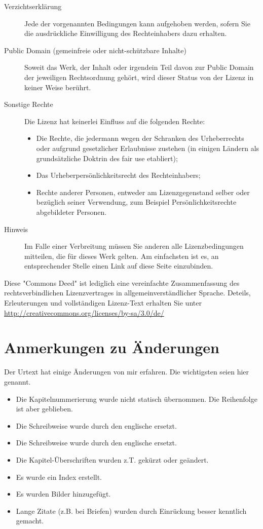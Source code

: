 \begin{description}
    \item[Verzichtserklärung] Jede der vorgenannten Bedingungen kann aufgehoben werden, 
	  sofern Sie die ausdrückliche Einwilligung des Rechteinhabers dazu erhalten.
    \item[Public Domain (gemeinfreie oder nicht-schützbare Inhalte)] Soweit das Werk, 
	  der Inhalt oder irgendein Teil davon zur Public Domain der jeweiligen Rechtsordnung 
	  gehört, wird dieser Status von der Lizenz in keiner Weise berührt.
    \item[Sonstige Rechte] Die Lizenz hat keinerlei Einfluss auf die folgenden Rechte:
      \begin{itemize}
          \item Die Rechte, die jedermann wegen der Schranken des Urheberrechts oder 
		aufgrund gesetzlicher Erlaubnisse zustehen (in einigen Ländern als 
		grundsätzliche Doktrin des fair use etabliert);
          \item Das Urheberpersönlichkeitsrecht des Rechteinhabers;
          \item Rechte anderer Personen, entweder am Lizenzgegenstand selber oder bezüglich 
		seiner Verwendung, zum Beispiel Persönlichkeitsrechte abgebildeter Personen.
      \end{itemize}
    \item[Hinweis] Im Falle einer Verbreitung müssen Sie anderen alle Lizenzbedingungen 
	  mitteilen, die für dieses Werk gelten. Am einfachsten ist es, an entsprechender 
	  Stelle einen Link auf diese Seite einzubinden.

 \end{description}

Diese "Commons Deed" ist lediglich eine vereinfachte Zusammenfassung des rechtsverbindlichen 
Lizenzvertrages in allgemeinverständlicher Sprache. Deteils, Erleuterungen und vollständigen
Lizenz-Text erhalten Sie unter \url{http://creativecommons.org/licenses/by-sa/3.0/de/}

\section*{Anmerkungen zu Änderungen}

Der Urtext hat einige Änderungen von mir erfahren. Die wichtigsten 
seien hier genannt.

\begin{itemize}
 \item Die Kapitelnummerierung wurde nicht statisch übernommen. Die 
  Reihenfolge ist aber geblieben.
 \item Die Schreibweise  wurde durch den englische 
   ersetzt.
 \item Die Schreibweise  wurde durch den englische  
   ersetzt.
 \item Die Kapitel-Überschriften wurden z.T. gekürzt oder geändert.
 \item Es wurde ein Index erstellt.
 \item Es wurden Bilder hinzugefügt.
 \item Lange Zitate (z.B. bei Briefen) wurden durch Einrückung besser  
  kenntlich gemacht.
\end{itemize}
